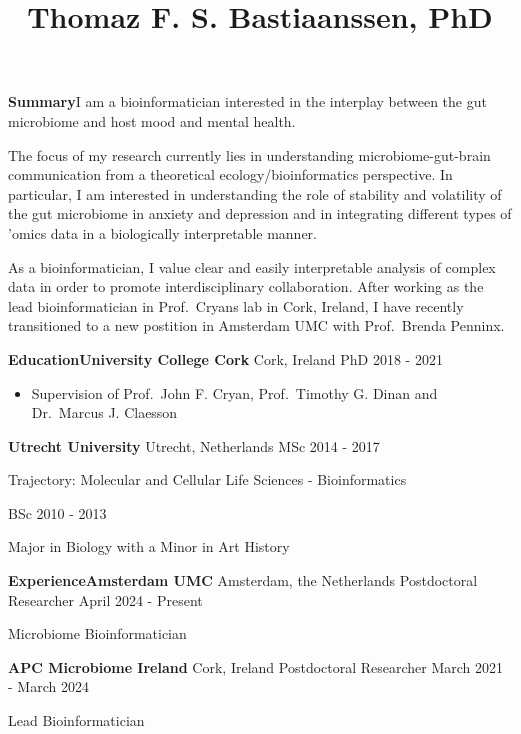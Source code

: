 \documentclass[
]{article}
\title{Thomaz F. S. Bastiaanssen, PhD}
\author{}
\date{\vspace{-2.5em}}
\providecommand{\tightlist}{%
  \setlength{\itemsep}{0pt}\setlength{\parskip}{0pt}}
\begin{document}
\maketitle

\textbf{Summary}I am a bioinformatician interested in the interplay
between the gut microbiome and host mood and mental health.

The focus of my research currently lies in understanding
microbiome-gut-brain communication from a theoretical
ecology/bioinformatics perspective. In particular, I am interested in
understanding the role of stability and volatility of the gut microbiome
in anxiety and depression and in integrating different types of 'omics
data in a biologically interpretable manner.

As a bioinformatician, I value clear and easily interpretable analysis
of complex data in order to promote interdisciplinary collaboration.
After working as the lead bioinformatician in Prof.~Cryans lab in Cork,
Ireland, I have recently transitioned to a new postition in Amsterdam
UMC with Prof.~Brenda Penninx.

\textbf{Education}\textbf{University College Cork} \textbar{} Cork,
Ireland PhD \textbar{} 2018 - 2021

\begin{itemize}
\tightlist
\item
  Supervision of Prof.~John F. Cryan, Prof.~Timothy G. Dinan and
  Dr.~Marcus J. Claesson
\end{itemize}

\textbf{Utrecht University} \textbar{} Utrecht, Netherlands MSc
\textbar{} 2014 - 2017

Trajectory: Molecular and Cellular Life Sciences - Bioinformatics

BSc \textbar{} 2010 - 2013

Major in Biology with a Minor in Art History

\textbf{Experience}\textbf{Amsterdam UMC} \textbar{} Amsterdam, the
Netherlands Postdoctoral Researcher \textbar{} April 2024 - Present

Microbiome Bioinformatician

\textbf{APC Microbiome Ireland} \textbar{} Cork, Ireland Postdoctoral
Researcher \textbar{} March 2021 - March 2024

Lead Bioinformatician
\end{document}

